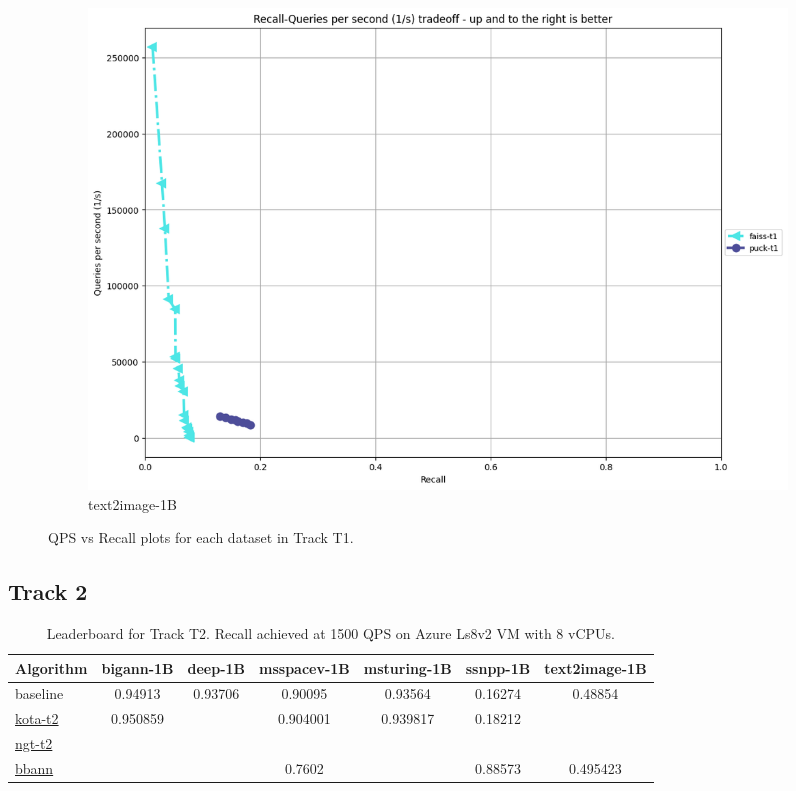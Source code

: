 \begin{figure}[ht]
\begin{subfigure}{10cm}
    \includegraphics[width=\linewidth]{../t1_t2/results/T1/neurips21/text2image-1B.png}
    \caption{text2image-1B}
  \end{subfigure}
      
  \caption{QPS vs Recall plots for each dataset in Track T1.}
  
\end{figure}

\fi

\subsection{Track 2}
\begin{table}
  \caption{Leaderboard for Track T2. Recall achieved at 1500 QPS on Azure Ls8v2 VM with 8 vCPUs.}
  \begin{tabular}{l|c|c|c|c|c|c}
    \hline
    Algorithm & bigann-1B  & deep-1B & msspacev-1B & msturing-1B &   ssnpp-1B  &     text2image-1B \\
    \hline
    baseline &  0.94913 & 0.93706 & 0.90095 & 0.93564 & 0.16274 & 0.48854 \\
    \hline
    \href{https://github.com/harsha-simhadri/big-ann-benchmarks/pull/62}{kota-t2} & 0.950859 & & 0.904001 & 0.939817 & 0.18212 & \\
    \href{https://github.com/harsha-simhadri/big-ann-benchmarks/pull/6}{ngt-t2} & & & & & & \\
    \href{https://github.com/harsha-simhadri/big-ann-benchmarks/pull/70}{bbann} & & & 0.7602 & & 0.88573 & 0.495423 \\
    \hline
     
  \end{tabular}
  
\end{table}

